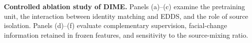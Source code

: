 \documentclass[10pt,journal,compsoc]{IEEEtran}
\begin{document}
\begin{table}[!t]
  \centering
  \setlength{\abovecaptionskip}{2pt}
  \caption{\textbf{Controlled ablation study of DIME.}
  Panels (a)--(c) examine the pretraining unit, the interaction between identity matching and EDDS, and the role of source isolation.
  Panels (d)--(f) evaluate complementary supervision, facial-change information retained in frozen features, and sensitivity to the source-mixing ratio.}
  \label{tab:dime_ablation}

  \begingroup
  \scriptsize
  \setlength{\aboverulesep}{0.35ex}
  \setlength{\belowrulesep}{0.35ex}
  \def\ablpaneltitle#1{%
    \parbox[c][1.35\baselineskip][c]{\linewidth}{%
      \centering\bfseries\strut #1\strut}\par
    \vspace{-0.10\baselineskip}%
  }


\end{table}
\end{document}
